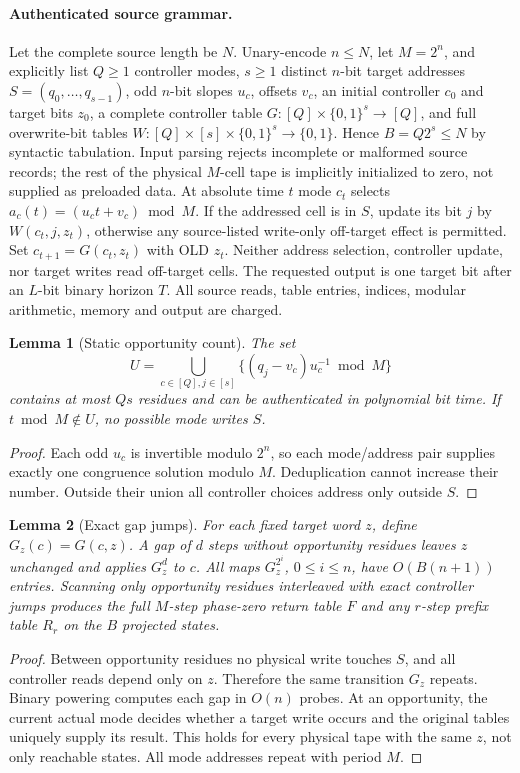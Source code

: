 \documentclass[11pt]{article}
\newtheorem{lemma}{Lemma}
\begin{document}
\paragraph{Authenticated source grammar.}
Let the complete source length be $N$. Unary-encode $n\le N$, let $M=2^n$, and explicitly list $Q\ge1$ controller modes, $s\ge1$ distinct $n$-bit target addresses $S=(q_0,\dots,q_{s-1})$, odd $n$-bit slopes $u_c$, offsets $v_c$, an initial controller $c_0$ and target bits $z_0$, a complete controller table $G:[Q]\times\{0,1\}^s\to[Q]$, and full overwrite-bit tables $W:[Q]\times[s]\times\{0,1\}^s\to\{0,1\}$. Hence $B=Q2^s\le N$ by syntactic tabulation. Input parsing rejects incomplete or malformed source records; the rest of the physical $M$-cell tape is implicitly initialized to zero, not supplied as preloaded data. At absolute time $t$ mode $c_t$ selects $a_c(t)=(u_ct+v_c)\bmod M$. If the addressed cell is in $S$, update its bit $j$ by $W(c_t,j,z_t)$, otherwise any source-listed write-only off-target effect is permitted. Set $c_{t+1}=G(c_t,z_t)$ with OLD $z_t$. Neither address selection, controller update, nor target writes read off-target cells. The requested output is one target bit after an $L$-bit binary horizon $T$. All source reads, table entries, indices, modular arithmetic, memory and output are charged.
\begin{lemma}[Static opportunity count]
The set
\[
U=\bigcup_{c\in[Q],j\in[s]}\{(q_j-v_c)u_c^{-1}\bmod M\}
\]
contains at most $Qs$ residues and can be authenticated in polynomial bit time. If $t\bmod M\notin U$, no possible mode writes $S$.
\end{lemma}
\begin{proof}
Each odd $u_c$ is invertible modulo $2^n$, so each mode/address pair supplies exactly one congruence solution modulo $M$. Deduplication cannot increase their number. Outside their union all controller choices address only outside $S$.
\end{proof}
\begin{lemma}[Exact gap jumps]
For each fixed target word $z$, define $G_z(c)=G(c,z)$. A gap of $d$ steps without opportunity residues leaves $z$ unchanged and applies $G_z^d$ to $c$. All maps $G_z^{2^i}$, $0\le i\le n$, have $O(B(n+1))$ entries. Scanning only opportunity residues interleaved with exact controller jumps produces the full $M$-step phase-zero return table $F$ and any $r$-step prefix table $R_r$ on the $B$ projected states.
\end{lemma}
\begin{proof}
Between opportunity residues no physical write touches $S$, and all controller reads depend only on $z$. Therefore the same transition $G_z$ repeats. Binary powering computes each gap in $O(n)$ probes. At an opportunity, the current actual mode decides whether a target write occurs and the original tables uniquely supply its result. This holds for every physical tape with the same $z$, not only reachable states. All mode addresses repeat with period $M$.
\end{proof}
\end{document}

